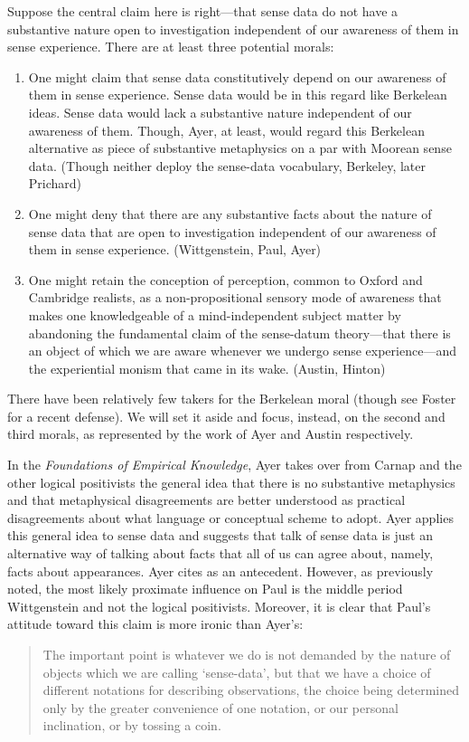 \documentclass[11pt]{article}
\begin{document}
Suppose the central claim here is right---that sense data do not have a substantive nature open to investigation independent of our awareness of them in sense experience. There are at least three potential morals:

\begin{enumerate}
	\item One might claim that sense data constitutively depend on our awareness of them in sense experience. Sense data would be in this regard like Berkelean ideas. Sense data would lack a substantive nature independent of our awareness of them. Though, Ayer, at least, would regard this Berkelean alternative as piece of substantive metaphysics on a par with Moorean sense data. (Though neither deploy the sense-data vocabulary, Berkeley, later Prichard)
	\item One might deny that there are any substantive facts about the nature of sense data that are open to investigation independent of our awareness of them in sense experience. (Wittgenstein, Paul, Ayer)
	\item One might retain the conception of perception, common to Oxford and Cambridge realists, as a non-propositional sensory mode of awareness that makes one knowledgeable of a mind-independent subject matter by abandoning the fundamental claim of the sense-datum theory---that there is an object of which we are aware whenever we undergo sense experience---and the experiential monism that came in its wake. (Austin, Hinton)
\end{enumerate}

There have been relatively few takers for the Berkelean moral (though see Foster \citeyear{Foster:00ny} for a recent defense). We will set it aside and focus, instead, on the second and third morals, as represented by the work of Ayer and Austin respectively.

In the \emph{Foundations of Empirical Knowledge}, Ayer takes over from Carnap and the other logical positivists the general idea that there is no substantive metaphysics and that metaphysical disagreements are better understood as practical disagreements about what language or conceptual scheme to adopt. Ayer applies this general idea to sense data and suggests that talk of sense data is just an alternative way of talking about facts that all of us can agree about, namely, facts about appearances. Ayer cites \citet{Paul:1936kd} as an antecedent. However, as previously noted, the most likely proximate influence on Paul is the middle period Wittgenstein and not the logical positivists. Moreover, it is clear that Paul's attitude toward this claim is more ironic than Ayer's:
\begin{quote}
    The important point is whatever we do is not demanded by the nature of objects which we are calling `sense-data', but that we have a choice of different notations for describing observations, the choice being determined only by the greater convenience of one notation, or our personal inclination, or by tossing a coin. \citep[74]{Paul:1936kd}
\end{quote}
\end{document}
